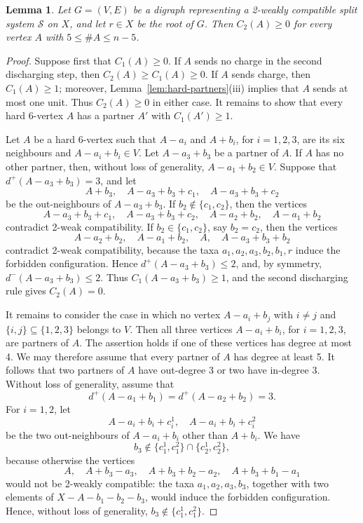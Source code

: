 \documentclass[10pt,a4paper]{amsart}
\newtheorem{lemma}{Lemma}
\newcommand{\cS}{\mathcal{S}}
\begin{document}
	\begin{lemma}\label{lem:nonnegative-charge}
		Let $G=(V,E)$ be a digraph representing a 2-weakly compatible split system $\cS$ on $X$, and let $r\in X$ be the root of $G$. Then $C_2(A)\ge 0$ for every vertex $A$ with $5\le\#A\le n-5$.
	\end{lemma}

	\begin{proof}
		Suppose first that $C_1(A)\ge 0$. If $A$ sends no charge in the second discharging step, then $C_2(A)\ge C_1(A)\ge 0$. If $A$ sends charge, then $C_1(A)\ge 1$; moreover, Lemma~\ref{lem:hard-partners}(iii) implies that $A$ sends at most one unit. Thus $C_2(A)\ge 0$ in either case. It remains to show that every hard 6-vertex $A$ has a partner $A'$ with $C_1(A')\ge 1$.
		
		Let $A$ be a hard 6-vertex such that $A-a_i$ and $A+b_i$, for $i=1,2,3$, are its six neighbours and $A-a_i+b_i\in V$. Let $A-a_3+b_3$ be a partner of $A$. If $A$ has no other partner, then, without loss of generality, $A-a_1+b_2\in V$. Suppose that $d^+(A-a_3+b_3)=3$, and let
		\[
		A+b_3,\quad A-a_3+b_3+c_1,\quad A-a_3+b_3+c_2
		\]
		be the out-neighbours of $A-a_3+b_3$. If $b_2\notin\{c_1,c_2\}$, then the vertices
		\[
		A-a_3+b_3+c_1,\quad A-a_3+b_3+c_2,\quad A-a_2+b_2,\quad A-a_1+b_2
		\]
		contradict 2-weak compatibility. If $b_2\in\{c_1,c_2\}$, say $b_2=c_2$, then the vertices
		\[
		A-a_2+b_2,\quad A-a_1+b_2,\quad A,\quad A-a_3+b_3+b_2
		\]
		contradict 2-weak compatibility, because the taxa $a_1,a_2,a_3,b_2,b_1,r$ induce the forbidden configuration. Hence $d^+(A-a_3+b_3)\le 2$, and, by symmetry, $d^-(A-a_3+b_3)\le 2$. Thus $C_1(A-a_3+b_3)\ge 1$, and the second discharging rule gives $C_2(A)=0$.
		
		It remains to consider the case in which no vertex $A-a_i+b_j$ with $i\ne j$ and $\{i,j\}\subseteq\{1,2,3\}$ belongs to $V$. Then all three vertices $A-a_i+b_i$, for $i=1,2,3$, are partners of $A$. The assertion holds if one of these vertices has degree at most 4. We may therefore assume that every partner of $A$ has degree at least 5. It follows that two partners of $A$ have out-degree 3 or two have in-degree 3. Without loss of generality, assume that
		\[
		d^+(A-a_1+b_1)=d^+(A-a_2+b_2)=3.
		\]
		For $i=1,2$, let
		\[
		A-a_i+b_i+c_i^1,\quad A-a_i+b_i+c_i^2
		\]
		be the two out-neighbours of $A-a_i+b_i$ other than $A+b_i$. We have
		\[
		b_3\notin \{c_1^1,c_1^2\}\cap\{c_2^1,c_2^2\},
		\]
		because otherwise the vertices
		\[
		A,\quad A+b_3-a_3,\quad A+b_3+b_2-a_2,\quad A+b_3+b_1-a_1
		\]
		would not be 2-weakly compatible: the taxa $a_1,a_2,a_3,b_3$, together with two elements of $X-A-b_1-b_2-b_3$, would induce the forbidden configuration. Hence, without loss of generality, $b_3\notin\{c_1^1,c_1^2\}$.
		

\end{proof}
\end{document}

